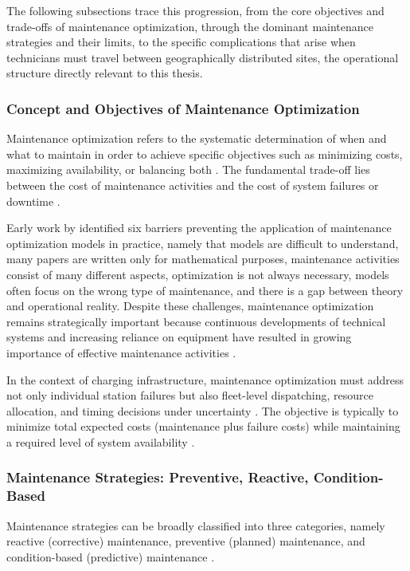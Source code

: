 \documentclass[12pt,oneside]{article}
\begin{document}
The following subsections trace this progression, from the core objectives and trade-offs of maintenance optimization, through the dominant maintenance strategies and their limits, to the specific complications that arise when technicians must travel between geographically distributed sites, the operational structure directly relevant to this thesis.


\subsubsection{Concept and Objectives of Maintenance Optimization}\label{subsubsec_concept_objectives}
Maintenance optimization refers to the systematic determination of when and what to maintain in
order to achieve specific objectives such as minimizing costs, maximizing availability, or balancing
both \citep{dejonge2020review}.
The fundamental trade-off lies between the cost of maintenance activities and the cost of system
failures or downtime \citep{dekker1996applications}.

Early work by \citet{dekker1996applications} identified six barriers preventing the application of maintenance
optimization models in practice, namely that models are difficult to understand, many papers are written only
for mathematical purposes, maintenance activities consist of many different aspects, optimization is
not always necessary, models often focus on the wrong type of maintenance, and there is a gap
between theory and operational reality.
Despite these challenges, maintenance optimization remains strategically important because
continuous developments of technical systems and increasing reliance on equipment have resulted in
growing importance of effective maintenance activities \citep{dejonge2020review}.

In the context of charging infrastructure, maintenance optimization must address not only individual
station failures but also fleet-level dispatching, resource allocation, and timing decisions under
uncertainty \citep{dejonge2020review}.
The objective is typically to minimize total expected costs (maintenance plus failure costs) while
maintaining a required level of system availability \citep{dejonge2020review}.


\subsubsection{Maintenance Strategies: Preventive, Reactive, Condition-Based}
Maintenance strategies can be broadly classified into three categories, namely reactive (corrective)
maintenance, preventive (planned) maintenance, and condition-based (predictive) maintenance
\citep{molkeda2023corrective, dejonge2020review}.
\end{document}
